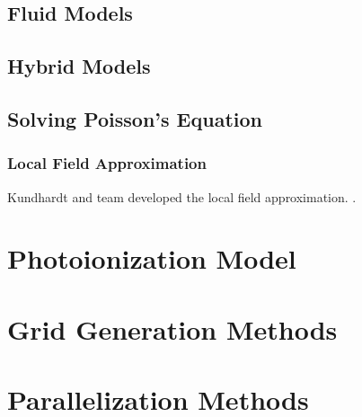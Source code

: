 \section{Fluid Models}

\section{Hybrid Models}

\section{Solving Poisson's Equation}

\subsection{Local Field Approximation}

Kundhardt and team developed the local field approximation. \cite{Kunhardt et al 1988}.





\chapter{Photoionization Model}



\chapter{Grid Generation Methods}

\chapter{Parallelization Methods}
